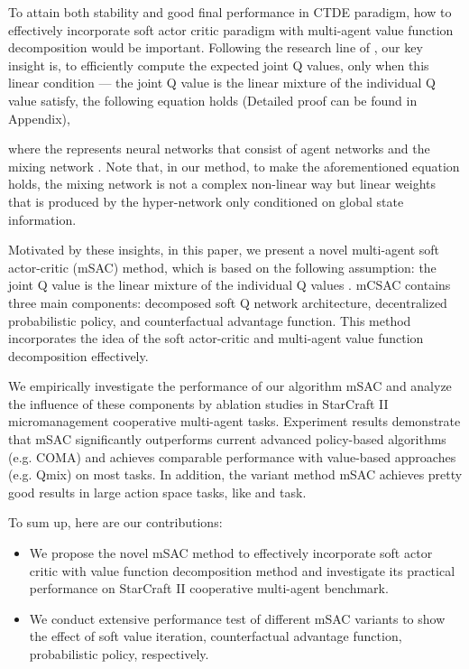 \documentclass[runningheads]{llncs}
\begin{document}
To attain both stability and good final performance in CTDE paradigm, how to effectively incorporate soft actor critic paradigm with multi-agent value function decomposition would be important. Following the research line of \cite{b14}, our key insight is, to efficiently compute the expected joint Q values, only when this linear condition --- the joint Q value  is the linear mixture of the individual Q value  satisfy, the following equation holds (Detailed proof can be found in Appendix), 

where the   represents neural networks that consist of agent networks   and the mixing network . Note that, in our method, to make the aforementioned equation holds, the mixing network  is not a complex non-linear way but linear weights that is produced by the hyper-network only conditioned on global state information. 


Motivated by these insights, in this paper, we present a novel multi-agent soft actor-critic (mSAC) method, which is based on the following assumption: the joint Q value  is the linear mixture of the individual Q values . mCSAC contains three main components: decomposed soft Q network architecture, decentralized probabilistic policy, and counterfactual advantage function. This method incorporates the idea of the soft actor-critic and multi-agent value function decomposition effectively.


We empirically investigate the performance of our algorithm mSAC and analyze the influence of these components by ablation studies in StarCraft II micromanagement cooperative multi-agent tasks. Experiment results demonstrate that mSAC significantly outperforms current advanced policy-based algorithms (e.g. COMA) and achieves comparable performance with value-based approaches (e.g. Qmix) on most tasks. In addition, the variant method mSAC achieves pretty good results in large action space tasks, like  and  task.


To sum up, here are our contributions: 
\begin{itemize}
	\item We propose the novel mSAC method to effectively incorporate soft actor critic with value function decomposition method and investigate its practical performance on StarCraft II cooperative multi-agent benchmark. 
	\item We conduct extensive performance test of different mSAC variants to show the effect of soft value iteration, counterfactual advantage function, probabilistic policy, respectively.
\end{itemize} 
\end{document}
